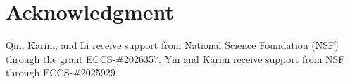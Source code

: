 \documentclass[journal]{IEEEtran}
\begin{document}
\section*{Acknowledgment}
Qin, Karim, and Li receive support from National Science Foundation (NSF) through the grant ECCS-\#2026357. Yin and Karim receive support from NSF through ECCS-\#2025929.


\ifCLASSOPTIONcaptionsoff
  \newpage
\fi








\end{document}
